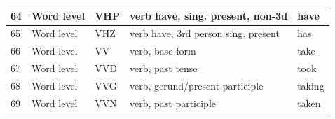 \begin{longtable}{|p{}|p{}|p{}|p{}|p{}|}
		\rowcolor[HTML]{9AFF99} 
		64                                                        & Word level                                                  & VHP                                                        & verb have, sing. present, non-3d                                                                                & have                                                                            \\ \hline
		\rowcolor[HTML]{9AFF99} 
		65                                                        & Word level                                                  & VHZ                                                        & verb have, 3rd person sing. present                                                                             & has                                                                             \\ \hline
		\rowcolor[HTML]{9AFF99} 
		66                                                        & Word level                                                  & VV                                                         & verb, base form                                                                                                 & take                                                                            \\ \hline
		\rowcolor[HTML]{9AFF99} 
		67                                                        & Word level                                                  & VVD                                                        & verb, past tense                                                                                                & took                                                                            \\ \hline
		\rowcolor[HTML]{9AFF99} 
		68                                                        & Word level                                                  & VVG                                                        & verb, gerund/present participle                                                                                 & taking                                                                          \\ \hline
		\rowcolor[HTML]{9AFF99} 
		69                                                        & Word level                                                  & VVN                                                        & verb, past participle                                                                                           & taken                                                                           \\ \hline

\end{longtable}
